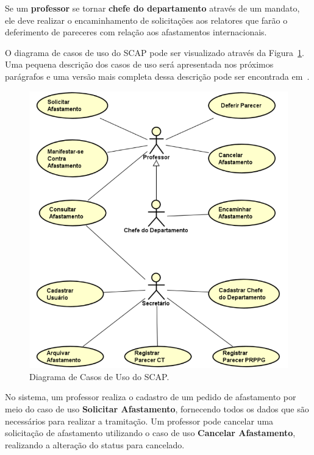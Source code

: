 Se um \textbf{professor} se tornar \textbf{chefe do departamento} através de um mandato, ele deve realizar o encaminhamento de solicitações aos relatores que farão o deferimento de pareceres com relação aos afastamentos internacionais.

O diagrama de casos de uso do SCAP pode ser visualizado através da Figura~\ref{fig-requisitos-casos-uso}. Uma pequena descrição dos casos de uso será apresentada nos próximos parágrafos e uma versão mais completa dessa descrição pode ser encontrada em~\cite{duarte-pg14,prado-pg15}.
     
\begin{figure}[h]
	\centering
	\includegraphics[scale=0.5]{figuras/fig-requisitos-casos-uso} 
	\caption{Diagrama de Casos de Uso do SCAP.}
	\label{fig-requisitos-casos-uso}
\end{figure}

No sistema, um professor realiza o cadastro de um pedido de afastamento por meio do caso de uso \textbf{Solicitar Afastamento}, fornecendo todos os dados que são necessários para realizar a tramitação. Um professor pode cancelar uma solicitação de afastamento utilizando o caso de uso \textbf{Cancelar Afastamento}, realizando a alteração do status para cancelado.

